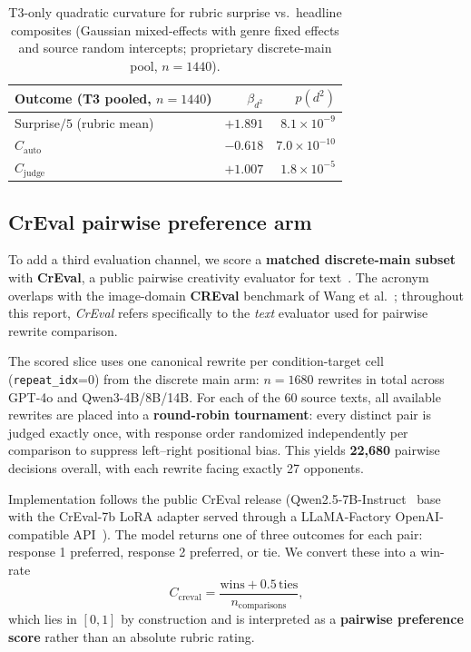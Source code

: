 \documentclass[sigconf,nonacm]{acmart}
\begin{document}
\begin{table}[t]
\centering
\small
\begin{tabular}{lrr}
\toprule
Outcome (T3 pooled, $n{=}1440$) & $\beta_{d^2}$ & $p(d^2)$ \\
\midrule
Surprise$/5$ (rubric mean) & $+1.891$ & $8.1{\times}10^{-9}$ \\
$C_{\mathrm{auto}}$ & $-0.618$ & $7.0{\times}10^{-10}$ \\
$C_{\mathrm{judge}}$ & $+1.007$ & $1.8{\times}10^{-5}$ \\
\bottomrule
\end{tabular}
\caption{T3-only quadratic curvature for rubric surprise vs.\ headline composites (Gaussian mixed-effects with genre fixed effects and source random intercepts; proprietary discrete-main pool, $n{=}1440$).}
\label{tab:surprise_curvature}
\end{table}

\subsection{CrEval pairwise preference arm}

To add a third evaluation channel, we score a \textbf{matched discrete-main subset} with \textbf{CrEval}, a public pairwise creativity evaluator for text~\cite{cao2025creval,creval_repo}. The acronym overlaps with the image-domain \textbf{CREval} benchmark of Wang et al.~\cite{wang2026crevalimage}; throughout this report, \emph{CrEval} refers specifically to the \emph{text} evaluator used for pairwise rewrite comparison.

The scored slice uses one canonical rewrite per condition-target cell (\texttt{repeat\_idx}{=}0) from the discrete main arm: $n{=}1680$ rewrites in total across GPT-4o and Qwen3-4B/8B/14B. For each of the 60 source texts, all available rewrites are placed into a \textbf{round-robin tournament}: every distinct pair is judged exactly once, with response order randomized independently per comparison to suppress left--right positional bias. This yields \textbf{22,680} pairwise decisions overall, with each rewrite facing exactly 27 opponents.

Implementation follows the public CrEval release (Qwen2.5-7B-Instruct~\cite{qwen2025} base with the CrEval-7b LoRA adapter served through a LLaMA-Factory OpenAI-compatible API~\cite{llamafactory2024,cao2025creval,creval_repo}). The model returns one of three outcomes for each pair: response 1 preferred, response 2 preferred, or tie. We convert these into a win-rate
\[
  C_{\mathrm{creval}} = \frac{\mathrm{wins} + 0.5\,\mathrm{ties}}{n_{\mathrm{comparisons}}},
\]
which lies in $[0,1]$ by construction and is interpreted as a \textbf{pairwise preference score} rather than an absolute rubric rating.
\end{document}
